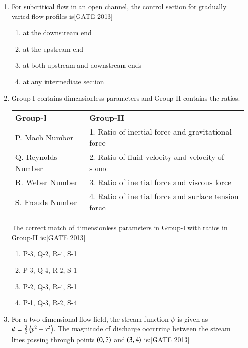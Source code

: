 \documentclass[journal,12pt,onecolumn]{IEEEtran}
\theoremstyle{remark}
\begin{document}
\begin{enumerate}
    \item For subcritical flow in an open channel, the control section for gradually varied flow profiles is\hfill{[GATE 2013]}
    
    \begin{multicols}{2}
    \begin{enumerate}
        \item at the downstream end
        \item at the upstream end
        \item at both upstream and downstream ends
        \item at any intermediate section
    \end{enumerate}
    \end{multicols}

    \item Group-I contains dimensionless parameters and Group-II contains the ratios.
    
    \begin{center}
    \begin{tabular}{p{6cm} p{9cm}}
        \textbf{Group-I} & \textbf{Group-II} \\

        P. Mach Number  & 1. Ratio of inertial force and gravitational force \\ 
        Q. Reynolds Number  & 2. Ratio of fluid velocity and velocity of sound \\
        R. Weber Number  & 3. Ratio of inertial force and viscous force \\ 
        S. Froude Number  & 4. Ratio of inertial force and surface tension force 
       
    \end{tabular}
\end{center}
    The correct match of dimensionless parameters in Group-I with ratios in Group-II is:\hfill{[GATE 2013]}
    
    \begin{multicols}{2}
    \begin{enumerate}
        \item P-3, Q-2, R-4, S-1
        \item P-3, Q-4, R-2, S-1
        \item P-2, Q-3, R-4, S-1
        \item P-1, Q-3, R-2, S-4
    \end{enumerate}
    \end{multicols}

    \item For a two-dimensional flow field, the stream function $\psi$ is given as $\psi = \frac{3}{2}\left( y^2 - x^2\right)$. The magnitude of discharge occurring between the stream lines passing through points $\left(0,3\right)$ and $\left(3,4\right)$ is:\hfill{[GATE 2013]}
    

\end{enumerate}
\end{document}
